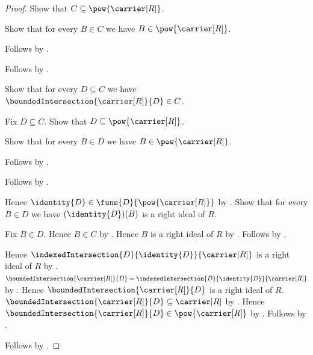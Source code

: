 \begin{proof}
    Show that $C\subseteq\pow{\carrier[R]}$.
    \begin{subproof}
        Show that for every $B\in C$ we have
            $B\in\pow{\carrier[R]}$.
        \begin{subproof}
            Follows by \auto.
        \end{subproof}
        Follows by .
    \end{subproof}
    Show that for every $D\subseteq C$ we have
        $\boundedIntersection{\carrier[R]}{D}\in C$.
    \begin{subproof}
        Fix $D\subseteq C$.
        Show that $D\subseteq\pow{\carrier[R]}$.
        \begin{subproof}
            Show that for every $B\in D$ we have
                $B\in\pow{\carrier[R]}$.
            \begin{subproof}
                Follows by .
            \end{subproof}
            Follows by .
        \end{subproof}
        Hence $\identity{D}\in
            \funs{D}{\pow{\carrier[R]}}$ by
            .
        Show that for every $B\in D$ we have
            $(\identity{D})(B)$ is a right ideal of $R$.
        \begin{subproof}
            Fix $B\in D$.
            Hence $B\in C$ by .
            Hence $B$ is a right ideal of $R$ by \auto.
            Follows by .
        \end{subproof}
        Hence
            $\indexedIntersection{D}{\identity{D}}{\carrier[R]}$
            is a right ideal of $R$ by
            .
        $\boundedIntersection{\carrier[R]}{D}
            =\indexedIntersection{D}{\identity{D}}{\carrier[R]}$ by
            .
        Hence $\boundedIntersection{\carrier[R]}{D}$ is a right ideal of
            $R$.
        $\boundedIntersection{\carrier[R]}{D}
            \subseteq\carrier[R]$ by
            .
        Hence $\boundedIntersection{\carrier[R]}{D}
            \in\pow{\carrier[R]}$ by .
        Follows by \auto.
    \end{subproof}
    Follows by .
\end{proof}

